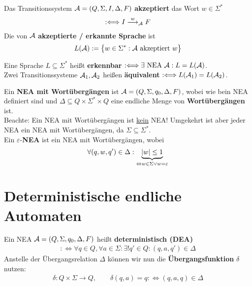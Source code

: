 \begin{definition}\label{def1.5}
	Das Transitionssystem $\mathcal{A}=(Q,\Sigma,I,\Delta,F)$ \textbf{akzeptiert} das Wort $w\in\Sigma^\ast$
	\begin{align*}
		:\Longleftrightarrow I\overset{w}{\longrightarrow}_{\mathcal{A}} F
	\end{align*}
	Die von $\mathcal{A}$ \textbf{akzeptierte / erkannte Sprache} ist
	\begin{align*}
		L(\mathcal{A}):=\big\lbrace w\in\Sigma^\ast:\mathcal{A}\text{ akzeptiert }w\big\rbrace
	\end{align*}
\end{definition}

\begin{definition}\label{def1.6}
	Eine Sprache $L\subseteq\Sigma^\ast$ heißt \textbf{erkennbar} $:\Longleftrightarrow\exists\text{ NEA }\mathcal{A}:L=L(\mathcal{A})$.\\
	Zwei Transitionssysteme $\mathcal{A}_1,\mathcal{A}_2$ heißen \textbf{äquivalent} $:\Longleftrightarrow L(\mathcal{A}_1)=L(\mathcal{A}_2)$.
\end{definition}

\begin{definition}\label{def1.8}
	Ein \textbf{NEA mit Wortübergängen} ist $\mathcal{A}=(Q,\Sigma,q_0,\Delta,F)$, wobei wie bein NEA definiert sind und $\Delta\subseteq Q\times\Sigma^\ast\times Q$ eine endliche Menge von \textbf{Wortübergängen} ist.\\
	Beachte: Ein NEA mit Wortübergängen ist \underline{kein} NEA!
	Umgekehrt ist aber jeder NEA ein NEA mit Wortübergängen, da $\Sigma\subseteq\Sigma^\ast$.\\
	Ein $\varepsilon$-\textbf{NEA} ist ein NEA mit Wortübergängen, wobei
	\begin{align*}
		\forall(q,w,q')\in\Delta:\underbrace{|w|\leq 1}_{\Leftrightarrow w\in\Sigma\vee w=\varepsilon}
	\end{align*}
\end{definition}

\section{Deterministische endliche Automaten}

\begin{definition}\label{def2.1}
	Ein NEA $\mathcal{A}=(Q,\Sigma,q_0,\Delta,F)$ heißt \textbf{deterministisch (DEA)} 
	\begin{align*}
		:\Longleftrightarrow\forall q\in Q,\forall a\in\Sigma:\exists! q'\in Q:(q,a,q')\in\Delta
	\end{align*}
	Anstelle der Übergangsrelation $\Delta$ können wir nun die \textbf{Übergangsfunktion} $\delta$ nutzen:
	\begin{align*}
		\delta:Q\times\Sigma\to Q,\qquad\delta(q,a)=q:\Longleftrightarrow(q,a,q)\in\Delta
	\end{align*}
\end{definition}

